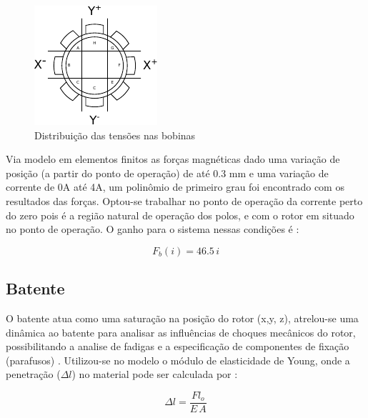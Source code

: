 \begin{figure}[th]
\centering
\includegraphics[width=0.7\linewidth]{./Figs/Modelagem/ativo-atuadores-conexao}
\caption{Distribuição das tensões nas bobinas}
\label{fig:blocos:tensao:bobinas:x:y}
\end{figure}

Via modelo em elementos finitos as forças magnéticas dado uma variação de posição (a partir do ponto de operação) de até 0.3 mm e uma variação de corrente de 0A até 4A, um polinômio de primeiro grau foi encontrado com os resultados das forças. Optou-se trabalhar no ponto de operação da corrente perto do zero pois é a região natural de operação dos polos, e com o rotor em situado no ponto de operação. O ganho para o sistema nessas condições é : 

\begin{equation}
     F_b(i) = 46.5 \, i
\end{equation}

\subsection{Batente}

O batente atua como uma saturação na posição do rotor (x,y, z), atrelou-se uma dinâmica ao batente para analisar as influências de choques mecânicos do rotor, possibilitando a analise de fadigas e a especificação de componentes de fixação (parafusos) . Utilizou-se no  modelo o módulo de elasticidade de Young, onde a penetração ($\Delta l $) no material pode ser calculada por :

\begin{equation}
	\Delta l =  \frac{F l_o}{E \, A}
\end{equation}

